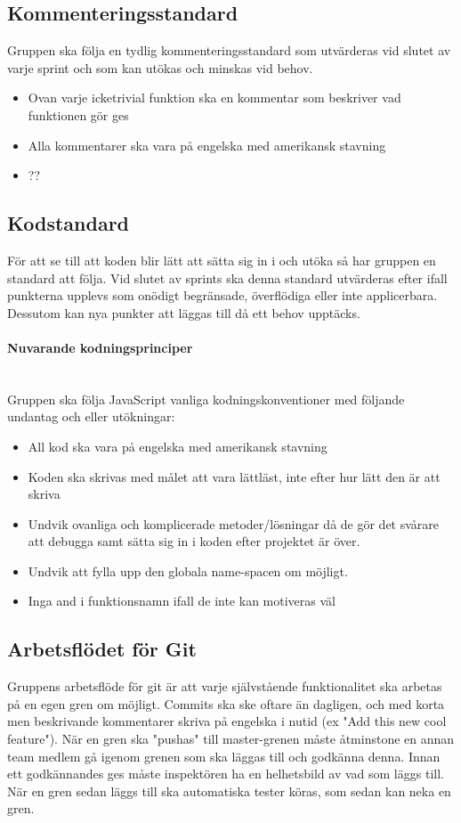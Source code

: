 \documentclass[10pt]{article}
\begin{document}
	
	\subsection{Kommenteringsstandard}
	Gruppen ska följa en tydlig kommenteringsstandard som utvärderas vid slutet av varje sprint och som kan utökas och minskas vid behov.
	
	\begin{itemize}
		\item 	Ovan varje icketrivial funktion ska en kommentar som beskriver vad funktionen gör ges
		\item Alla kommentarer ska vara på engelska med amerikansk stavning
		\item ??
	\end{itemize}

	
	\subsection{Kodstandard}
	För att se till att koden blir lätt att sätta sig in i och utöka så har gruppen en standard att följa. Vid slutet av sprints ska denna standard utvärderas efter ifall punkterna upplevs som onödigt begränsade, överflödiga eller inte applicerbara. Dessutom kan nya punkter att läggas till då ett behov upptäcks.

	\paragraph{Nuvarande kodningsprinciper} \mbox{}
	\\
	Gruppen ska följa JavaScript vanliga kodningskonventioner med följande undantag och eller utökningar:
	\begin{itemize}
	\item All kod ska vara på engelska med amerikansk stavning
	\item Koden ska skrivas med målet att vara lättläst, inte efter hur lätt den är att skriva
	\item Undvik ovanliga och komplicerade metoder/lösningar då de gör det svårare att debugga samt sätta sig in i koden efter projektet är över.
	\item Undvik att fylla upp den globala name-spacen om möjligt.
	\item Inga  and i funktionsnamn ifall de inte kan motiveras väl
	
	\end{itemize}
	
	\subsection{Arbetsflödet för Git}
	Gruppens arbetsflöde för git är att varje självstående funktionalitet ska arbetas på en egen gren om möjligt. Commits ska ske oftare än dagligen, och med korta men beskrivande kommentarer skriva på engelska i nutid (ex "Add this new cool feature"). När en gren ska "pushas" till master-grenen måste åtminstone en annan team medlem gå igenom grenen som ska läggas till och godkänna denna. Innan ett godkännandes ges måste inspektören ha en helhetsbild av vad som läggs till. När en gren sedan läggs till ska automatiska tester köras, som sedan kan neka en gren.
	
\end{document}
